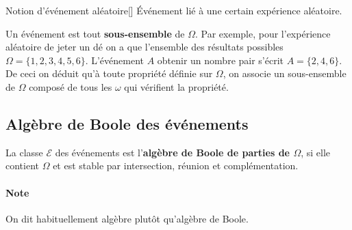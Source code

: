 \documentclass[10pt, french]{report}
\begin{document}
\begin{multicols*}{2}
\begin{definitionGENERAL}{Notion d'événement aléatoire}[]
Événement lié à une certain expérience aléatoire. 

\bigskip	

Un événement est tout \textbf{sous-ensemble} de $\Omega$. Par exemple, pour l'expérience aléatoire de jeter un dé on a que l'ensemble des résultats possibles $\Omega = \{1, 2, 3, 4, 5, 6\}$. L'événement $A$ \og obtenir un nombre pair \fg{} s'écrit $A = \{2, 4, 6\}$. De ceci on déduit qu'à toute propriété définie sur $\Omega$, on associe un sous-ensemble de $\Omega$ composé de tous les $\omega$ qui vérifient la propriété. 
\end{definitionGENERAL}

\subsection{Algèbre de Boole des événements}
\begin{definitionNOHFILL}
La classe $\mathcal{E}$ des événements est l'\textbf{algèbre de Boole de parties de $\Omega$}, si elle contient $\Omega$ et est stable par intersection, réunion et complémentation.

\bigskip

\paragraph{Note}	On dit habituellement algèbre plutôt qu'algèbre de Boole.
\end{definitionNOHFILL}



\end{multicols*}
\end{document}
